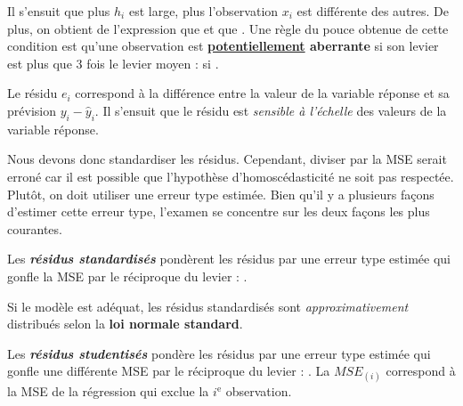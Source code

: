 \documentclass[french]{article}
\begin{document}
\begin{multicols*}{2}
\begin{definitionNOHFILL}
\bigskip

Il s'ensuit que plus $h_{i}$ est large, plus l'observation $x_{i}$ est différente des autres. De plus, on obtient de l'expression que  et que . Une règle du pouce obtenue de cette condition est qu'une observation est \textbf{\underline{potentiellement} aberrante} si son levier est plus que 3 fois le levier moyen :  si .
\end{definitionNOHFILL}

\bigskip

\begin{rappel_enhanced}[Contexte]
Le résidu $e_{i}$ correspond à la différence entre la valeur de la variable réponse et sa prévision $y_{i} - \hat{y}_{i}$. Il s'ensuit que le résidu est \textit{sensible à l'échelle} des valeurs de la variable réponse. 

\bigskip

Nous devons donc standardiser les résidus. Cependant, diviser par la MSE serait erroné car il est possible que l'hypothèse d'homoscédasticité ne soit pas respectée. Plutôt, on doit utiliser une erreur type estimée. Bien qu'il y a plusieurs façons d'estimer cette erreur type, l'examen se concentre sur les deux façons les plus courantes.
\end{rappel_enhanced}

\begin{definitionNOHFILLsub}
Les \textbf{\textit{résidus standardisés}} pondèrent les résidus par une erreur type estimée qui gonfle la MSE par le réciproque du levier : .

\bigskip

Si le modèle est adéquat, les résidus standardisés sont \textit{approximativement} distribués selon la \textbf{loi normale standard}.
\end{definitionNOHFILLsub}

\begin{definitionNOHFILLsub}
Les \textbf{\textit{résidus studentisés}} pondère les résidus par une erreur type estimée qui gonfle une différente MSE par le réciproque du levier : . La $MSE_{(i)}$ correspond à la MSE de la régression qui exclue la $i^{\text{e}}$ observation.


\end{definitionNOHFILLsub}
\end{multicols*}
\end{document}

